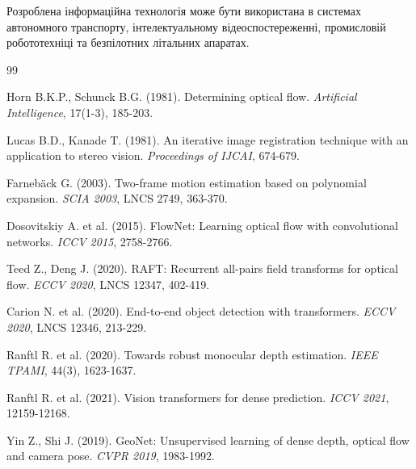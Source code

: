 \documentclass[14pt, a4paper]{extarticle}
\numberwithin{equation}{section}
\begin{document}
Розроблена інформаційна технологія може бути використана в системах автономного транспорту, інтелектуальному відеоспостереженні, промисловій робототехніці та безпілотних літальних апаратах.

\begin{thebibliography}{99}

Horn B.K.P., Schunck B.G. (1981). Determining optical flow. \textit{Artificial Intelligence}, 17(1-3), 185-203.

Lucas B.D., Kanade T. (1981). An iterative image registration technique with an application to stereo vision. \textit{Proceedings of IJCAI}, 674-679.

Farnebäck G. (2003). Two-frame motion estimation based on polynomial expansion. \textit{SCIA 2003}, LNCS 2749, 363-370.

Dosovitskiy A. et al. (2015). FlowNet: Learning optical flow with convolutional networks. \textit{ICCV 2015}, 2758-2766.

Teed Z., Deng J. (2020). RAFT: Recurrent all-pairs field transforms for optical flow. \textit{ECCV 2020}, LNCS 12347, 402-419.

Carion N. et al. (2020). End-to-end object detection with transformers. \textit{ECCV 2020}, LNCS 12346, 213-229.

Ranftl R. et al. (2020). Towards robust monocular depth estimation. \textit{IEEE TPAMI}, 44(3), 1623-1637.

Ranftl R. et al. (2021). Vision transformers for dense prediction. \textit{ICCV 2021}, 12159-12168.

Yin Z., Shi J. (2019). GeoNet: Unsupervised learning of dense depth, optical flow and camera pose. \textit{CVPR 2019}, 1983-1992.

\end{thebibliography}
\end{document}
